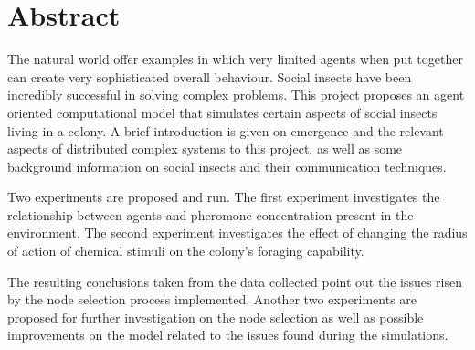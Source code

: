 

\begingroup
\let\clearpage\relax
\let\cleardoublepage\relax
\let\cleardoublepage\relax

\chapter*{Abstract} %

The natural world offer examples in which very limited agents when put together can create very sophisticated overall behaviour. Social insects have been incredibly successful in solving complex problems. This project proposes an agent oriented computational model that simulates certain aspects of social insects living in a colony. A brief introduction is given on emergence and the relevant aspects of distributed complex systems to this project, as well as some background information on social insects and their communication techniques.

Two experiments are proposed and run. The first experiment investigates the relationship between agents and pheromone concentration present in the environment. The second experiment investigates the effect of changing the radius of action of chemical stimuli on the colony's foraging capability.

The resulting conclusions taken from the data collected point out the issues risen by the node selection process implemented. Another two experiments are proposed for further investigation on the node selection as well as possible improvements on the model related to the issues found during the simulations.

\endgroup

\vfill